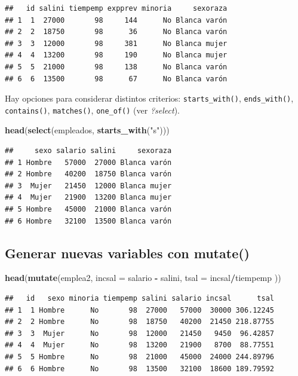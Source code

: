 \documentclass[]{book}
\newenvironment{Shaded}{\begin{snugshade}}{\end{snugshade}}
\newcommand{\KeywordTok}[1]{\textcolor[rgb]{0.13,0.29,0.53}{\textbf{#1}}}
\newcommand{\DataTypeTok}[1]{\textcolor[rgb]{0.13,0.29,0.53}{#1}}
\newcommand{\StringTok}[1]{\textcolor[rgb]{0.31,0.60,0.02}{#1}}
\newcommand{\OperatorTok}[1]{\textcolor[rgb]{0.81,0.36,0.00}{\textbf{#1}}}
\newcommand{\NormalTok}[1]{#1}
\begin{document}
\begin{verbatim}
##   id salini tiempemp expprev minoria     sexoraza
## 1  1  27000       98     144      No Blanca varón
## 2  2  18750       98      36      No Blanca varón
## 3  3  12000       98     381      No Blanca mujer
## 4  4  13200       98     190      No Blanca mujer
## 5  5  21000       98     138      No Blanca varón
## 6  6  13500       98      67      No Blanca varón
\end{verbatim}

Hay opciones para considerar distintos criterios:
\texttt{starts\_with()}, \texttt{ends\_with()}, \texttt{contains()},
\texttt{matches()}, \texttt{one\_of()} (ver \emph{?select}).

\begin{Shaded}
\begin{Highlighting}[]
\KeywordTok{head}\NormalTok{(}\KeywordTok{select}\NormalTok{(empleados, }\KeywordTok{starts_with}\NormalTok{(}\StringTok{"s"}\NormalTok{)))}
\end{Highlighting}
\end{Shaded}

\begin{verbatim}
##     sexo salario salini     sexoraza
## 1 Hombre   57000  27000 Blanca varón
## 2 Hombre   40200  18750 Blanca varón
## 3  Mujer   21450  12000 Blanca mujer
## 4  Mujer   21900  13200 Blanca mujer
## 5 Hombre   45000  21000 Blanca varón
## 6 Hombre   32100  13500 Blanca varón
\end{verbatim}

\subsection{\texorpdfstring{Generar nuevas variables con
\textbf{mutate()}}{Generar nuevas variables con mutate()}}\label{generar-nuevas-variables-con-mutate}

\begin{Shaded}
\begin{Highlighting}[]
\KeywordTok{head}\NormalTok{(}\KeywordTok{mutate}\NormalTok{(emplea2, }\DataTypeTok{incsal =}\NormalTok{ salario }\OperatorTok{-}\StringTok{ }\NormalTok{salini, }\DataTypeTok{tsal =}\NormalTok{ incsal}\OperatorTok{/}\NormalTok{tiempemp ))}
\end{Highlighting}
\end{Shaded}

\begin{verbatim}
##   id   sexo minoria tiempemp salini salario incsal      tsal
## 1  1 Hombre      No       98  27000   57000  30000 306.12245
## 2  2 Hombre      No       98  18750   40200  21450 218.87755
## 3  3  Mujer      No       98  12000   21450   9450  96.42857
## 4  4  Mujer      No       98  13200   21900   8700  88.77551
## 5  5 Hombre      No       98  21000   45000  24000 244.89796
## 6  6 Hombre      No       98  13500   32100  18600 189.79592
\end{verbatim}
\end{document}
